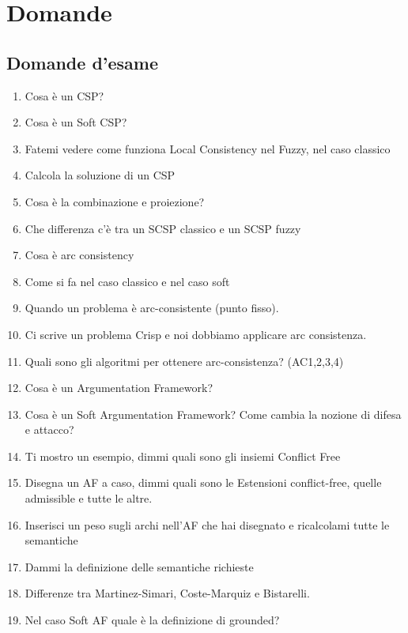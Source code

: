 \chapter{Domande} \label{Domande}
\section{Domande d'esame}
\begin{enumerate}
    \item Cosa è un CSP?
    \item Cosa è un Soft CSP?
    \item Fatemi vedere come funziona Local Consistency nel Fuzzy, nel caso
          classico
    \item Calcola la soluzione di un CSP
    \item Cosa è la combinazione e proiezione?
    \item Che differenza c'è tra un SCSP classico e un SCSP fuzzy
    \item Cosa è arc consistency
    \item Come si fa nel caso classico e nel caso soft
    \item Quando un problema è arc-consistente (punto fisso).
    \item Ci scrive un problema Crisp e noi dobbiamo applicare arc consistenza.
    \item Quali sono gli algoritmi per ottenere arc-consistenza? (AC1,2,3,4)
    \item Cosa è un Argumentation Framework?
    \item Cosa è un Soft Argumentation Framework? Come cambia la nozione di
          difesa e attacco?
    \item Ti mostro un esempio, dimmi quali sono gli insiemi Conflict Free
    \item Disegna un AF a caso, dimmi quali sono le Estensioni conflict-free,
          quelle admissible e tutte le altre.
    \item Inserisci un peso sugli archi nell'AF che hai disegnato e ricalcolami
          tutte le semantiche
    \item Dammi la definizione delle semantiche richieste
    \item Differenze tra Martinez-Simari, Coste-Marquiz e Bistarelli.
    \item Nel caso Soft AF quale è la definizione di grounded?
\end{enumerate}
